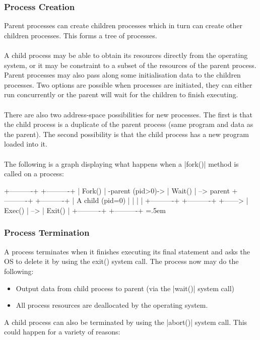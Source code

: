 \documentclass{article}
\newenvironment{cverbatim}
 {\SaveVerbatim{cverb}}
 {\endSaveVerbatim
  \flushleft\fboxrule=0pt\fboxsep=.5em
  \colorbox{cverbbg}{\BUseVerbatim{cverb}}%
  \endflushleft
}
\begin{document}
\subsubsection{Process Creation}
Parent processes can create children processes which in turn can create other children processes. This forms a tree of processes. \\ \\
A child process may be able to obtain its resources directly from the operating system, or it may be constraint to a subset of the resources of the parent process. Parent processes may also pass along some initialisation data to the children processes. Two options are possible when processes are initiated, they can either run concurrently or the parent will wait for the children to finish executing. \\ \\
There are also two address-space possibilities for new processes. The first is that the child process is a duplicate of the parent process (same program and data as the parent). The second possibility is that the child process has a new program loaded into it. \\ \\
The following is a graph displaying what happens when a \cverb|fork()| method is called on a process:

\begin{cverbatim}
  +----------+                   +----------+
  |  Fork()  | -parent (pid>0)-> |  Wait()  | --> parent 
  +----------+                   +----------+
       |                              A
  child (pid=0)                       |
       |                              |
       |        +----------+     +----------+
       +------> |  Exec()  | --> |  Exit()  |
                +----------+     +----------+
\end{cverbatim}

\subsubsection{Process Termination}
A process terminates when it finishes executing its final statement and asks the OS to delete it by using the exit() system call. The process now may do the following:

\begin{itemize}
	\item Output data from child process to parent (via the \cverb|wait()| system call)
	\item All process resources are deallocated by the operating system.
\end{itemize}
A child process can also be terminated by using the \cverb|abort()| system call. This could happen for a variety of reasons:
\end{document}
